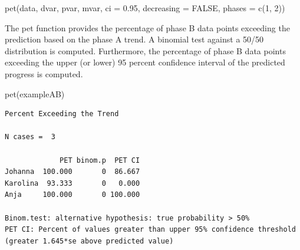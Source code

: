 \documentclass[
  letterpaper,
  DIV=11,
  numbers=noendperiod]{scrreprt}
\newenvironment{Shaded}{\begin{snugshade}}{\end{snugshade}}
\newcommand{\FunctionTok}[1]{\textcolor[rgb]{0.28,0.35,0.67}{#1}}
\newcommand{\NormalTok}[1]{\textcolor[rgb]{0.00,0.23,0.31}{#1}}
\begin{document}
\begin{tcolorbox}[enhanced jigsaw, toprule=.15mm, colframe=quarto-callout-tip-color-frame, left=2mm, colback=white, breakable, bottomrule=.15mm, arc=.35mm, rightrule=.15mm, leftrule=.75mm, opacityback=0]
\begin{minipage}[t]{5.5mm}
\textcolor{quarto-callout-tip-color}{\faLightbulb}
\end{minipage}%
\begin{minipage}[t]{\textwidth - 5.5mm}
pet(data, dvar, pvar, mvar, ci = 0.95, decreasing = FALSE, phases = c(1,
2))\end{minipage}%
\end{tcolorbox}

The pet function provides the percentage of phase B data points
exceeding the prediction based on the phase A trend. A binomial test
against a 50/50 distribution is computed. Furthermore, the percentage of
phase B data points exceeding the upper (or lower) 95 percent confidence
interval of the predicted progress is computed.

\begin{Shaded}
\begin{Highlighting}[]
\FunctionTok{pet}\NormalTok{(exampleAB)}
\end{Highlighting}
\end{Shaded}

\begin{verbatim}
Percent Exceeding the Trend

N cases =  3 

             PET binom.p  PET CI
Johanna  100.000       0  86.667
Karolina  93.333       0   0.000
Anja     100.000       0 100.000

Binom.test: alternative hypothesis: true probability > 50%
PET CI: Percent of values greater than upper 95% confidence threshold (greater 1.645*se above predicted value)
\end{verbatim}
\end{document}
